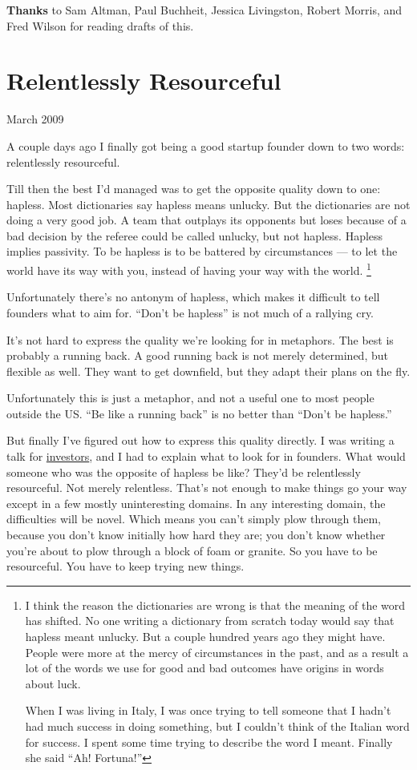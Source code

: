 \documentclass[12pt]{book}
\begin{document}
\textbf{Thanks} to Sam Altman, Paul Buchheit, Jessica Livingston, Robert
Morris, and Fred Wilson for reading drafts of this.
\chapter{Relentlessly Resourceful}

March 2009

A couple days ago I finally got being a good startup founder down to two
words: relentlessly resourceful.

Till then the best I'd managed was to get the opposite quality down to
one: hapless. Most dictionaries say hapless means unlucky. But the
dictionaries are not doing a very good job. A team that outplays its
opponents but loses because of a bad decision by the referee could be
called unlucky, but not hapless. Hapless implies passivity. To be
hapless is to be battered by circumstances --- to let the world have its
way with you, instead of having your way with the world.
\footnote{I think the reason the dictionaries are wrong is that the
meaning of the word has shifted. No one writing a dictionary from
scratch today would say that hapless meant unlucky. But a couple hundred
years ago they might have. People were more at the mercy of
circumstances in the past, and as a result a lot of the words we use for
good and bad outcomes have origins in words about luck.

When I was living in Italy, I was once trying to tell someone that I
hadn't had much success in doing something, but I couldn't think of the
Italian word for success. I spent some time trying to describe the word
I meant. Finally she said ``Ah! Fortuna!''}

Unfortunately there's no antonym of hapless, which makes it difficult to
tell founders what to aim for. ``Don't be hapless'' is not much of a
rallying cry.

It's not hard to express the quality we're looking for in metaphors. The
best is probably a running back. A good running back is not merely
determined, but flexible as well. They want to get downfield, but they
adapt their plans on the fly.

Unfortunately this is just a metaphor, and not a useful one to most
people outside the US. ``Be like a running back'' is no better than
``Don't be hapless.''

But finally I've figured out how to express this quality directly. I was
writing a talk for \href{angelinvesting.html}{investors}, and I had to
explain what to look for in founders. What would someone who was the
opposite of hapless be like? They'd be relentlessly resourceful. Not
merely relentless. That's not enough to make things go your way except
in a few mostly uninteresting domains. In any interesting domain, the
difficulties will be novel. Which means you can't simply plow through
them, because you don't know initially how hard they are; you don't know
whether you're about to plow through a block of foam or granite. So you
have to be resourceful. You have to keep trying new things.
\end{document}
